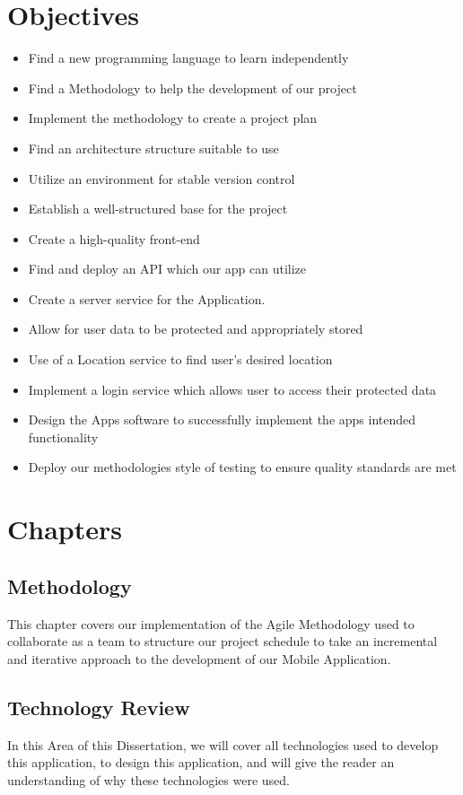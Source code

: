 \section{Objectives}
\begin{itemize}
    \item Find a new programming language to learn independently
    \item Find a Methodology to help the development of our project
    \item Implement the methodology to create a project plan
    \item Find an architecture structure suitable to use
    \item Utilize an environment for stable version control
    \item Establish a well-structured base for the project
    \item Create a high-quality front-end
    \item Find and deploy an API which our app can utilize
    \item Create a server service for the Application.
    \item Allow for user data to be protected and appropriately stored
    \item Use of a Location service to find user's desired location
    \item Implement a login service which allows user to access their protected data
    \item Design the Apps software to successfully implement the apps intended functionality
    \item Deploy our methodologies style of testing to ensure quality standards are met

\end{itemize}
\section{Chapters}
\subsection{Methodology}
This chapter covers our implementation of the Agile Methodology used to collaborate as a team to structure our project schedule to take an incremental and iterative approach to the development of our Mobile Application.
\subsection{Technology Review}
In this Area of this Dissertation, we will cover all technologies used to develop this application, to design this application, and will give the reader an understanding of why these technologies were used.
